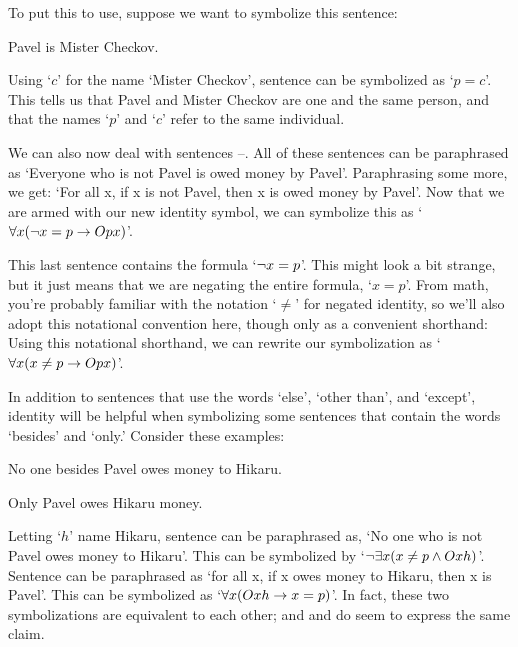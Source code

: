 To put this to use, suppose we want to symbolize this sentence:
\begin{earg}
\item[\ex{else2}] Pavel is Mister Checkov.
\end{earg}
Using `$c$' for the name `Mister Checkov', sentence  can be symbolized as `$p=c$'. This tells us that Pavel and Mister Checkov are one and the same person, and that the names `$p$' and `$c$' refer to the same individual.

We can also now deal with sentences --. All of these sentences can be  paraphrased as `Everyone who is not Pavel is owed money by Pavel'. Paraphrasing some more, we get: `For all x, if x is not Pavel, then x is owed money by Pavel'. Now that we are armed with our new identity symbol, we can symbolize this as `$\forall x (\neg x = p \rightarrow Opx)$'.

This last sentence contains the formula `$\neg x = p$'. This might look a bit strange, but it just means that we are negating the entire formula, `$x = p$'.  From math, you're probably familiar with the notation `$\neq$' for negated identity, so we'll also adopt this notational convention here, though only as a convenient shorthand:
Using this notational shorthand, we can rewrite our symbolization as `$\forall x (x \neq p \rightarrow Opx)$'.


In addition to sentences that use the words `else', `other than', and `except', identity will be helpful when symbolizing some sentences that contain the words `besides' and `only.' Consider these examples:

\begin{earg}
\item[\ex{else3}] No one besides Pavel owes money to Hikaru.
\item[\ex{else4}] Only Pavel owes Hikaru money.
\end{earg}
Letting `$h$' name Hikaru, sentence  can be paraphrased as, `No one who is not Pavel owes money to Hikaru'. This can be symbolized by `$\neg\exists x(x \neq p \wedge Oxh)$'. Sentence  can be paraphrased as `for all x, if x owes money to Hikaru, then x is Pavel'. This can be symbolized as `$\forall x (Oxh \rightarrow x = p)$'.  In fact, these two symbolizations are equivalent to each other; and  and  do seem to express the same claim.

